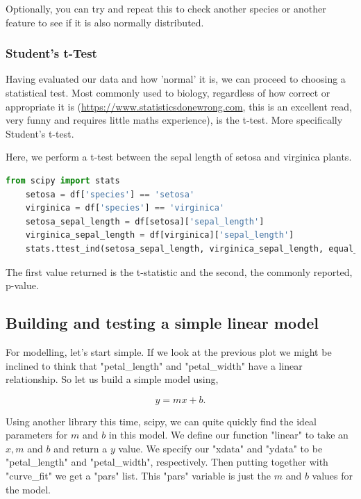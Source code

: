 \documentclass[12pt]{article}
\begin{document}
Optionally, you can try and repeat this to check another species or another feature to see if it is also normally distributed.

\subsubsection{Student's t-Test}

Having evaluated our data and how 'normal' it is, we can proceed to choosing a statistical test. Most commonly used to biology, regardless of how correct or appropriate it is (\href{https://www.statisticsdonewrong.com}{https://www.statisticsdonewrong.com}, this is an excellent read, very funny and requires little maths experience), is the t-test. More specifically Student's t-test.  

Here, we perform a t-test between the sepal length of setosa and virginica plants.

\begin{lstlisting}[language=Python]
    from scipy import stats
    setosa = df['species'] == 'setosa'
    virginica = df['species'] == 'virginica'
    setosa_sepal_length = df[setosa]['sepal_length']
    virginica_sepal_length = df[virginica]['sepal_length']
    stats.ttest_ind(setosa_sepal_length, virginica_sepal_length, equal_var=False)
\end{lstlisting}

The first value returned is the t-statistic and the second, the commonly reported, p-value. 

\subsection{Building and testing a simple linear model}

For modelling, let's start simple. If we look at the previous plot we might be inclined to think that "petal\_length" and "petal\_width" have a linear relationship. So let us build a simple model using, 

\begin{equation}
    y = mx+b.
\end{equation}

Using another library this time, scipy, we can quite quickly find the ideal parameters for $m$ and $b$ in this model. We define our function "linear" to take an $x,m$ and $b$ and return a $y$ value. We specify our "xdata" and "ydata" to be "petal\_length" and "petal\_width", respectively. Then putting together with "curve\_fit" we get a "pars" list. This "pars" variable is just the $m$ and $b$ values for the model.  
\end{document}
